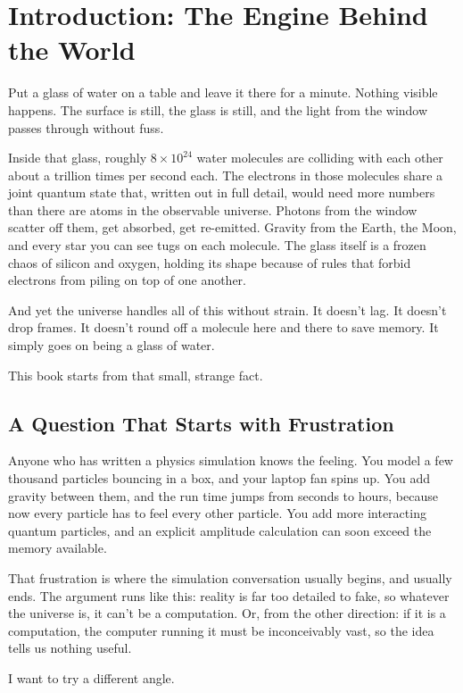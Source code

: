 \chapter{Introduction: The Engine Behind the World}

Put a glass of water on a table and leave it there for a minute. Nothing visible happens. The surface is still, the glass is still, and the light from the window passes through without fuss.

Inside that glass, roughly \(8 \times 10^{24}\) water molecules are colliding with each other about a trillion times per second each. The electrons in those molecules share a joint quantum state that, written out in full detail, would need more numbers than there are atoms in the observable universe. Photons from the window scatter off them, get absorbed, get re-emitted. Gravity from the Earth, the Moon, and every star you can see tugs on each molecule. The glass itself is a frozen chaos of silicon and oxygen, holding its shape because of rules that forbid electrons from piling on top of one another.

And yet the universe handles all of this without strain. It doesn't lag. It doesn't drop frames. It doesn't round off a molecule here and there to save memory. It simply goes on being a glass of water.

This book starts from that small, strange fact.

\section{A Question That Starts with Frustration}

Anyone who has written a physics simulation knows the feeling. You model a few thousand particles bouncing in a box, and your laptop fan spins up. You add gravity between them, and the run time jumps from seconds to hours, because now every particle has to feel every other particle. You add more interacting quantum particles, and an explicit amplitude calculation can soon exceed the memory available.

That frustration is where the simulation conversation usually begins, and usually ends. The argument runs like this: reality is far too detailed to fake, so whatever the universe is, it can't be a computation. Or, from the other direction: if it is a computation, the computer running it must be inconceivably vast, so the idea tells us nothing useful.

I want to try a different angle.

